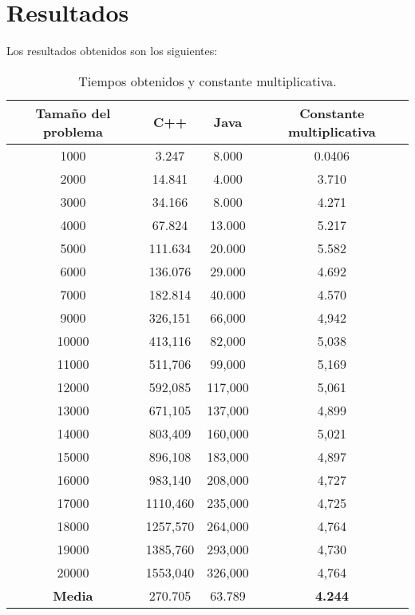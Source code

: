 \documentclass{article}
\begin{document}
\section{Resultados}
Los resultados obtenidos son los siguientes:

\begin{table}[H]
\begin{center}
\begin{tabular}{|c|c|c|c|}
\hline
\textbf{Tamaño del problema} & \textbf{C++} & \textbf{Java} & \textbf{Constante multiplicativa} \\
\hline \hline
1000 & 3.247 & 8.000 & 0.0406 \\ 
\hline
2000 & 14.841 & 4.000 & 3.710 \\
\hline
3000 & 34.166 & 8.000 & 4.271 \\
\hline
4000 & 67.824 & 13.000 & 5.217 \\
\hline
5000 & 111.634 & 20.000 & 5.582 \\
\hline
6000 & 136.076 & 29.000 & 4.692 \\
\hline
7000 & 182.814 & 40.000 & 4.570 \\
\hline
9000  &	326,151  & 66,000  & 4,942 \\
\hline
10000 &	413,116  & 82,000  & 5,038 \\
\hline
11000 &	511,706  & 99,000  & 5,169 \\
\hline
12000 &	592,085	 & 117,000 & 5,061 \\
\hline
13000 &	671,105	 & 137,000 & 4,899 \\
\hline
14000 &	803,409	 & 160,000 & 5,021 \\
\hline
15000 &	896,108  & 183,000 & 4,897 \\
\hline
16000 &	983,140	 & 208,000 & 4,727 \\
\hline
17000 &	1110,460 & 235,000 & 4,725 \\
\hline
18000 &	1257,570 & 264,000 & 4,764 \\
\hline
19000 &	1385,760 & 293,000 & 4,730 \\
\hline
20000 &	1553,040 & 326,000 & 4,764 \\
\hline
\textbf{Media} & 270.705 & 63.789 & \textbf{4.244} \\
\hline
\end{tabular}
\caption{Tiempos obtenidos y constante multiplicativa.}
\end{center}
\end{table}
\end{document}
